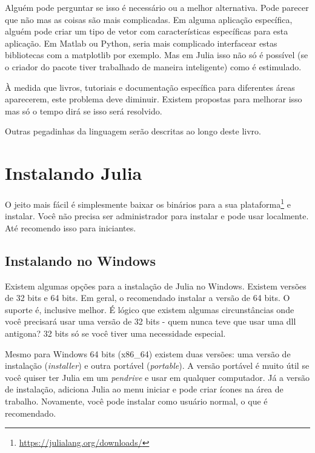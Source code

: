 \documentclass[
  notoc %
]{tufte-book}
\DeclareRobustCommand{\href}[2]{#2\footnote{\url{#1}}}
\begin{document}
Alguém pode perguntar se isso é necessário ou a melhor alternativa. Pode
parecer que não mas as coisas são mais complicadas. Em alguma aplicação
específica, alguém pode criar um tipo de vetor com características
específicas para esta aplicação. Em Matlab ou Python, seria mais
complicado interfacear estas bibliotecas com a matplotlib por exemplo.
Mas em Julia isso não só é possível (se o criador do pacote tiver
trabalhado de maneira inteligente) como é estimulado.

À medida que livros, tutoriais e documentação específica para diferentes
áreas aparecerem, este problema deve diminuir. Existem propostas para
melhorar isso mas só o tempo dirá se isso será resolvido.

Outras pegadinhas da linguagem serão descritas ao longo deste livro.

\hypertarget{sec:instalauxe7uxe3o}{%
\section{Instalando Julia}\label{sec:instalauxe7uxe3o}}

O jeito mais fácil é simplesmente
\href{https://julialang.org/downloads/}{baixar os binários para a sua
plataforma} e instalar. Você não precisa ser administrador para instalar
e pode usar localmente. Até recomendo isso para iniciantes.

\hypertarget{instalando-no-windows}{%
\subsection{Instalando no Windows}\label{instalando-no-windows}}

Existem algumas opções para a instalação de Julia no Windows. Existem
versões de 32 bits e 64 bits. Em geral, o recomendado instalar a versão
de 64 bits. O suporte é, inclusive melhor. É lógico que existem algumas
circunstâncias onde você precisará usar uma versão de 32 bits - quem
nunca teve que usar uma dll antigona? 32 bits só se você tiver uma
necessidade especial.

Mesmo para Windows 64 bits (x86\_64) existem duas versões: uma versão de
instalação (\emph{installer}) e outra portável (\emph{portable}). A
versão portável é muito útil se você quiser ter Julia em um
\emph{pendrive} e usar em qualquer computador. Já a versão de
instalação, adiciona Julia ao menu iniciar e pode criar ícones na área
de trabalho. Novamente, você pode instalar como usuário normal, o que é
recomendado.
\end{document}
